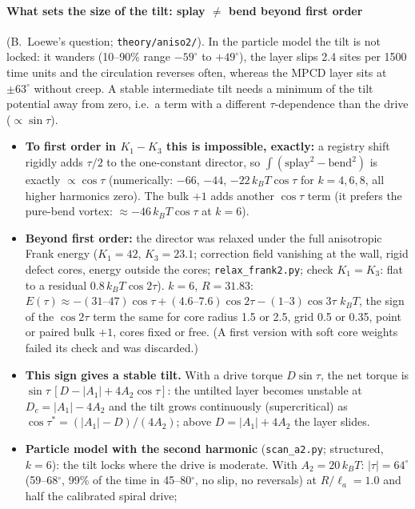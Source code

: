 \paragraph{What sets the size of the tilt: splay $\neq$ bend beyond first order} (B.~Loewe's question; \texttt{theory/aniso2/}).
In the particle model the tilt is not locked: it wanders (10--90\% range $-59^\circ$ to $+49^\circ$), the layer slips 2.4 sites per 1500 time units and the
circulation reverses often, whereas the MPCD layer sits at $\pm63^\circ$ without creep. A stable intermediate tilt needs a minimum of the tilt potential away
from zero, i.e.\ a term with a different $\tau$-dependence than the drive ($\propto\sin\tau$).
\begin{itemize}
  \item \textbf{To first order in $K_1-K_3$ this is impossible, exactly:} a registry shift rigidly adds $\tau/2$ to the one-constant director, so
        $\int(\text{splay}^2-\text{bend}^2)$ is exactly $\propto\cos\tau$ (numerically: $-66$, $-44$, $-22\,k_BT\cos\tau$ for $k=4,6,8$, all higher harmonics zero). The
        bulk $+1$ adds another $\cos\tau$ term (it prefers the pure-bend vortex: $\approx-46\,k_BT\cos\tau$ at $k=6$).
  \item \textbf{Beyond first order:} the director was relaxed under the full anisotropic Frank energy ($K_1=42$, $K_3=23.1$; correction field vanishing at the wall,
        rigid defect cores, energy outside the cores; \texttt{relax\_frank2.py}; check $K_1=K_3$: flat to a residual $0.8\,k_BT\cos2\tau$). $k=6$, $R=31.83$:
        $E(\tau)\approx-(31\text{--}47)\cos\tau+(4.6\text{--}7.6)\cos2\tau-(1\text{--}3)\cos3\tau$ $k_BT$, the sign of the $\cos2\tau$ term the same for core radius 1.5
        or 2.5, grid 0.5 or 0.35, point or paired bulk $+1$, cores fixed or free. (A first version with soft core weights failed its check and was discarded.)
  \item \textbf{This sign gives a stable tilt.} With a drive torque $D\sin\tau$, the net torque is $\sin\tau\,[D-|A_1|+4A_2\cos\tau]$: the untilted layer becomes
        unstable at $D_c=|A_1|-4A_2$ and the tilt grows continuously (supercritical) as $\cos\tau^*=(|A_1|-D)/(4A_2)$; above $D=|A_1|+4A_2$ the layer slides.
  \item \textbf{Particle model with the second harmonic} (\texttt{scan\_a2.py}; structured, $k=6$): the tilt locks where the drive is moderate. With $A_2=20\,k_BT$:
        $|\tau|=64^\circ$ (59--68$^\circ$, 99\% of the time in 45--80$^\circ$, no slip, no reversals) at $R/\ell_a=1.0$ and half the calibrated spiral drive;

\end{itemize}
